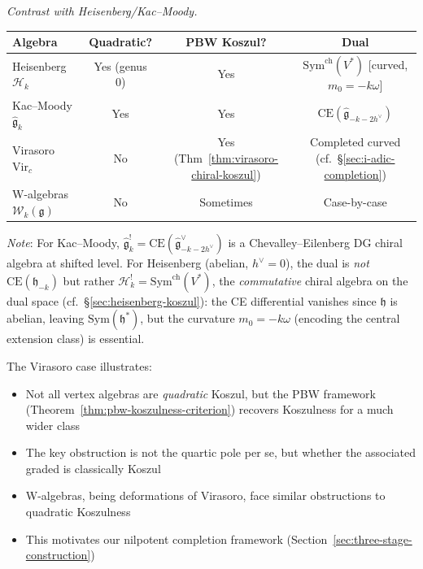 \begin{remark}
\emph{Contrast with Heisenberg/Kac--Moody.}
\begin{center}
\begin{tabular}{|l|c|c|c|}
\hline
\textbf{Algebra} & \textbf{Quadratic?} & \textbf{PBW Koszul?} & \textbf{Dual} \\
\hline
Heisenberg $\mathcal{H}_k$ & Yes (genus 0) & Yes & $\mathrm{Sym}^{\mathrm{ch}}(V^*)$ [curved, $m_0 = -k\omega$] \\
Kac--Moody $\widehat{\mathfrak{g}}_k$ & Yes & Yes & $\text{CE}(\widehat{\mathfrak{g}}_{-k-2h^\vee})$ \\
Virasoro $\text{Vir}_c$ & No & Yes (Thm~\ref{thm:virasoro-chiral-koszul}) & Completed curved (cf.\ \S\ref{sec:i-adic-completion}) \\
W-algebras $\mathcal{W}_k(\mathfrak{g})$ & No & Sometimes & Case-by-case \\
\hline
\end{tabular}
\end{center}

\emph{Note}: For Kac--Moody, $\hat{\mathfrak{g}}_k^! = \mathrm{CE}(\hat{\mathfrak{g}}^{\vee}_{-k-2h^\vee})$ is a Chevalley--Eilenberg DG chiral algebra at shifted level. For Heisenberg (abelian, $h^\vee = 0$), the dual is \emph{not} $\mathrm{CE}(\mathfrak{h}_{-k})$ but rather $\mathcal{H}_k^! = \mathrm{Sym}^{\mathrm{ch}}(V^*)$, the \emph{commutative} chiral algebra on the dual space (cf.\ \S\ref{sec:heisenberg-koszul}): the CE differential vanishes since $\mathfrak{h}$ is abelian, leaving $\mathrm{Sym}(\mathfrak{h}^*)$, but the curvature $m_0 = -k\omega$ (encoding the central extension class) is essential.
\end{remark}

\begin{remark}
The Virasoro case illustrates:
\begin{itemize}
\item Not all vertex algebras are \emph{quadratic} Koszul, but the PBW framework (Theorem~\ref{thm:pbw-koszulness-criterion}) recovers Koszulness for a much wider class
\item The key obstruction is not the quartic pole per se, but whether the associated graded is classically Koszul
\item W-algebras, being deformations of Virasoro, face similar obstructions to quadratic Koszulness
\item This motivates our nilpotent completion framework (Section~\ref{sec:three-stage-construction})
\end{itemize}
\end{remark}

